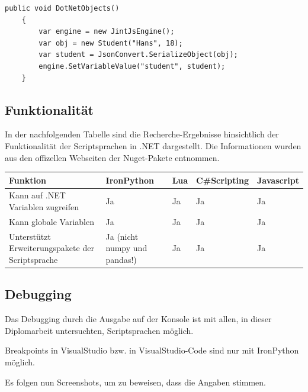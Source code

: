 \begin{lstlisting}[language={[Sharp]C}, caption=JavascriptObjects, label=lst:imp:jsObj]
    public void DotNetObjects()
    {
        var engine = new JintJsEngine();
        var obj = new Student("Hans", 18);
        var student = JsonConvert.SerializeObject(obj);
        engine.SetVariableValue("student", student);           
    }
\end{lstlisting}

\newpage
\subsection{Funktionalität}
In der nachfolgenden Tabelle sind die Recherche-Ergebnisse hinsichtlich der Funktionalität der Scriptsprachen in .NET dargestellt.
Die Informationen wurden aus den offizellen Webseiten der Nuget-Pakete entnommen.

\begin{table}[H]
    \begin{tabular}{|p{3cm}|p{3cm}|p{3cm}|p{3cm}|p{3cm}|}
        \hline
        Funktion & IronPython & Lua & C\#Scripting & Javascript\\ \hline
        Kann auf .NET Variablen zugreifen & Ja & Ja & Ja & Ja \\ \hline
        Kann globale Variablen & Ja & Ja & Ja & Ja \\ \hline
        Unterstützt Erweiterungspakete der Scriptsprache & Ja (nicht numpy und pandas!) & Ja & Ja & Ja \\ \hline 
    \end{tabular} 
\end{table}

\newpage
\subsection{Debugging}
Das Debugging durch die Ausgabe auf der Konsole ist mit allen, in dieser Diplomarbeit untersuchten, Scriptsprachen möglich.

Breakpoints in VisualStudio bzw. in VisualStudio-Code sind nur mit IronPython möglich.


Es folgen nun Screenshots, um zu beweisen, dass die Angaben stimmen.

